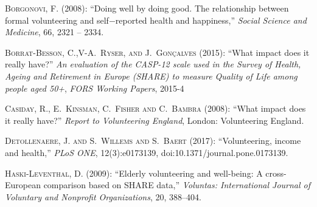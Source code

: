 \documentclass[10pt, letterpaper]{article}
\begin{document}
\begin{spacing}{1.4}
\begin{thebibliography}{87}
\textsc{Borgonovi, F.} (2008): \enquote{Doing well by doing good. The relationship between formal volunteering and self$-$reported health and happiness,} \emph{Social Science and Medicine}, 66,  2321 -- 2334.

\textsc{Borrat-Besson, C.,V-A.~Ryser, and J.~Gonçalves} (2015):  \enquote{What impact does it really have?} \emph{An evaluation of the CASP-12 scale used in the Survey of Health, Ageing and Retirement in Europe (SHARE) to measure Quality of Life among people aged 50+}, \emph{FORS Working Papers}, 2015-4


\textsc{Casiday, R., E.~Kinsman, C.~Fisher and C.~Bambra} (2008):  \enquote{What impact does it really have?} \emph{Report to Volunteering England}, London: Volunteering England.

\textsc{Detollenaere, J. and S.~Willems and S.~Baert} (2017): \enquote{Volunteering, income and health,} \emph{PLoS ONE}, 12(3):e0173139,  doi:10.1371/journal.pone.0173139.

\textsc{Haski-Leventhal, D.} (2009): \enquote{Elderly volunteering and
  well-being: A cross-European comparison based on SHARE data,} \emph{Voluntas:
  International Journal of Voluntary and Nonprofit Organizations}, 20,
  388--404.
  
  

\end{thebibliography}
\end{spacing}
\end{document}
